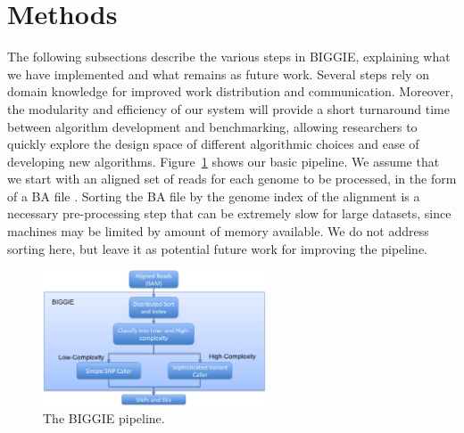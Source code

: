 \documentclass[10pt]{article}
\newcommand\TODO[1]{\textcolor{red}{TODO: #1}}
\begin{document}


\section{Methods}

The following subsections describe the various steps in BIGGIE, explaining what we have implemented and what remains as future work.
Several steps
rely on domain knowledge for improved work distribution and communication.
Moreover, the modularity and efficiency of our system will provide a short 
turnaround time between algorithm development and benchmarking, allowing
researchers to quickly explore the design space of different algorithmic
choices and ease of developing new algorithms. Figure~\ref{fig:pipeline} shows our basic pipeline. We assume that we start with an
aligned set of reads for each genome to be processed, in the form of a BA file
\cite{samtools}.
Sorting the BA file by the genome index of the alignment is a necessary pre-processing step that can be extremely slow for large datasets, since machines may be limited by amount of memory available.
We do not address sorting here, but leave it as potential future work for improving the pipeline.

\begin{figure}[h!]
  	\includegraphics[width=2.6in]{figs/pipeline.png}
	\caption{The BIGGIE pipeline.}
	\label{fig:pipeline}
\end{figure}
 
\end{document}
